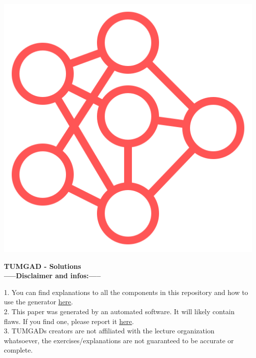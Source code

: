 \documentclass[12pt]{article}
\begin{document}
    \begin{center}
        \includegraphics[scale=0.25]{faviconRed.png} %
        \vspace{15px}

        {\selectfont
            \textbf{\LARGE{TUMGAD - Solutions}}\\
        }
        \vspace{20px}
        \textbf{\LARGE{-----Disclaimer and infos:-----}}
        \\[0.2in]
    \end{center}
    1. You can find explanations to all the components in this repository and how to use the generator \href{https://sebastianoner.github.io/TUMGAD/src/routes}{\underline{here}}.
    \\[0.2in]
    2. This paper was generated by an automated software.
    It will likely contain flaws.
    If you find one, please report it \href{https://github.com/SebastianOner/TUMGAD/issues/new?assignees=&labels=&template=bug_report.md&title=}{\underline{here}}.
    \\[0.2in]
    3. TUMGADs creators are not affiliated with the lecture organization whatsoever, the exercises/explanations are not
    guaranteed to be accurate or complete.
    \\[0.2in]
\end{document}
